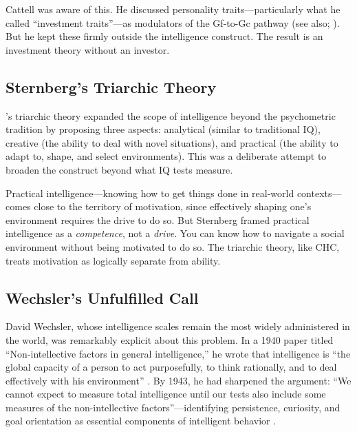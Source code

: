 \documentclass[12pt,a4paper]{article}
\begin{document}
Cattell was aware of this. He discussed personality traits---\hspace{0pt}particularly what he called ``investment traits''---\hspace{0pt}as modulators of the Gf-to-Gc pathway (see also; \citealp{Ziegler2012}). But he kept these firmly outside the intelligence construct. The result is an investment theory without an investor.

\subsection{Sternberg's Triarchic Theory}

\citeauthor{Sternberg1985}'s \citeyearpar{Sternberg1985} triarchic theory expanded the scope of intelligence beyond the psychometric tradition by proposing three aspects: analytical (similar to traditional IQ), creative (the ability to deal with novel situations), and practical (the ability to adapt to, shape, and select environments). This was a deliberate attempt to broaden the construct beyond what IQ tests measure.

Practical intelligence---\hspace{0pt}knowing how to get things done in real-world contexts---\hspace{0pt}comes close to the territory of motivation, since effectively shaping one's environment requires the drive to do so. But Sternberg framed practical intelligence as a \emph{competence}, not a \emph{drive}. You can know how to navigate a social environment without being motivated to do so. The triarchic theory, like CHC, treats motivation as logically separate from ability.

\subsection{Wechsler's Unfulfilled Call}

David Wechsler, whose intelligence scales remain the most widely administered in the world, was remarkably explicit about this problem. In a 1940 paper titled ``Non-intellective factors in general intelligence,'' he wrote that intelligence is ``the global capacity of a person to act purposefully, to think rationally, and to deal effectively with his environment'' \citep{Wechsler1940}. By 1943, he had sharpened the argument: ``We cannot expect to measure total intelligence until our tests also include some measures of the non-intellective factors''---\hspace{0pt}identifying persistence, curiosity, and goal orientation as essential components of intelligent behavior \citep{Wechsler1943}.
\end{document}
